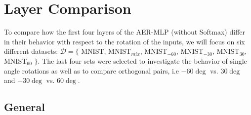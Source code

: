 \documentclass[10pt,a4paper]{article}
\begin{document}



\section{Layer Comparison}
To compare how the first four layers of the AER-MLP (without  Softmax) differ in their behavior with respect to the rotation of the inputs, we will focus on six different datasets:  $\mathcal{D} = \{$ MNIST, MNIST$_{mix}$, MNIST$_{-60}$, MNIST$_{-30}$, MNIST$_{30}$, MNIST$_{60}$ $\}$. The last four sets were selected to investigate the behavior of single angle rotations as well as to compare orthogonal pairs, i.e $-60 \deg$ vs. $30\deg$ and $-30\deg$ vs. $60\deg$. 

\subsection{General}
\end{document}
